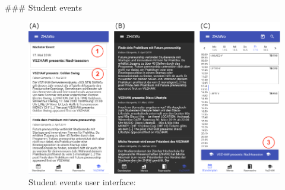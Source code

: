 \begin{markdown}
### Student events

\begin{figure}[H]
  \includegraphics[width=16cm, center]{./figures/events_figure.png}
  \captionsetup{width=15.5cm}
  \caption[Student events user interface]{\textsf{Student events user interface}: }
  \label{fig:EventsFigure}
\end{figure}


\end{markdown}

